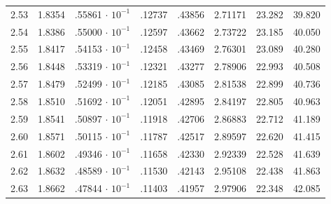 \begin{minipage}{0.435\textwidth}
{\begin{tabular}{c|c|c|c|c|c|c|c}
        2.53 & 1.8354 & .55861$\,\cdot\,10^{-1}$ & .12737 & .43856 & 2.71171 & 23.282 & 39.820 \\
        2.54 & 1.8386 & .55000$\,\cdot\,10^{-1}$ & .12597 & .43662 & 2.73722 & 23.185 & 40.050 \\
        2.55 & 1.8417 & .54153$\,\cdot\,10^{-1}$ & .12458 & .43469 & 2.76301 & 23.089 & 40.280 \\
        2.56 & 1.8448 & .53319$\,\cdot\,10^{-1}$ & .12321 & .43277 & 2.78906 & 22.993 & 40.508 \\
        2.57 & 1.8479 & .52499$\,\cdot\,10^{-1}$ & .12185 & .43085 & 2.81538 & 22.899 & 40.736 \\
        2.58 & 1.8510 & .51692$\,\cdot\,10^{-1}$ & .12051 & .42895 & 2.84197 & 22.805 & 40.963 \\
        2.59 & 1.8541 & .50897$\,\cdot\,10^{-1}$ & .11918 & .42706 & 2.86883 & 22.712 & 41.189 \\
        2.60 & 1.8571 & .50115$\,\cdot\,10^{-1}$ & .11787 & .42517 & 2.89597 & 22.620 & 41.415 \\
        2.61 & 1.8602 & .49346$\,\cdot\,10^{-1}$ & .11658 & .42330 & 2.92339 & 22.528 & 41.639 \\
        2.62 & 1.8632 & .48589$\,\cdot\,10^{-1}$ & .11530 & .42143 & 2.95108 & 22.438 & 41.863 \\
        2.63 & 1.8662 & .47844$\,\cdot\,10^{-1}$ & .11403 & .41957 & 2.97906 & 22.348 & 42.085
    \end{tabular}
    }
\end{minipage}%
\hspace{-2mm}\vline\hspace{-3mm}
